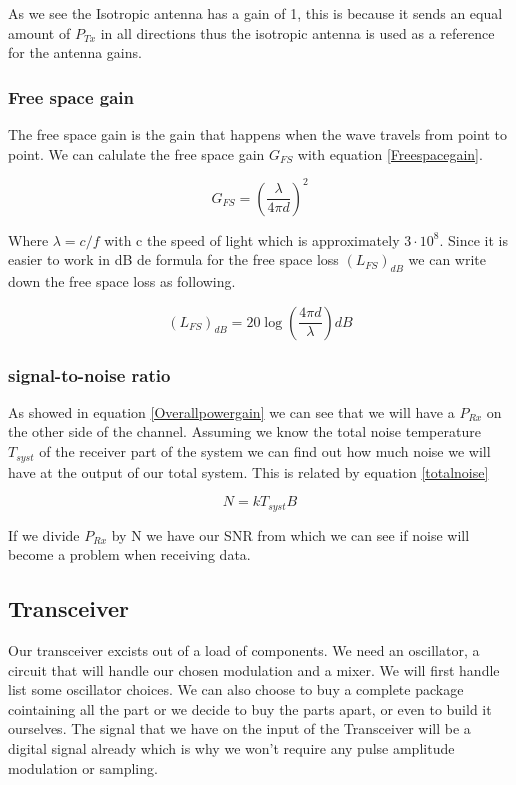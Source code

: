 \documentclass[10pt,a4paper]{article}
\begin{document}
As we see the Isotropic antenna has a gain of 1, this is because it sends an equal amount of $P_{Tx}$ in all directions thus the isotropic antenna is used as a reference for the antenna gains.

\subsubsection{Free space gain}
The free space gain is the gain that happens when the wave travels from point to point. We can calulate the free space gain $G_{FS}$ with equation \ref{Freespacegain}.

\begin{equation}
\label{Freespacegain}
G_{FS} = (\frac{\lambda}{4\pi d})^2
\end{equation}

Where $\lambda = c/f$ with c the speed of light which is approximately $3\cdot 10^8$. Since it is easier to work in dB de formula for the free space loss $(L_{FS})_{dB}$ we can write down the free space loss as following.

\begin{equation}
(L_{FS})_{dB} = 20 \log(\frac{4\pi d}{\lambda})dB
\end{equation}

\subsubsection{signal-to-noise ratio}
As showed in equation \ref{Overallpowergain} we can see that we will have a $P_{Rx}$ on the other side of the channel. Assuming we know the total noise temperature $T_{syst}$ of the receiver part of the system we can find out how much noise we will have at the output of our total system. This is related by equation \ref{totalnoise}

\begin{equation}
\label{totalnoise}
N=kT_{syst}B
\end{equation}

If we divide $P_{Rx}$ by N we have our SNR from which we can see if noise will become a problem when receiving data.

\subsection{Transceiver}
Our transceiver excists out of a load of components. We need an oscillator, a circuit that will handle our chosen modulation and a mixer. We will first handle list some oscillator choices. We can also choose to buy a complete package cointaining all the part or we decide to buy the parts apart, or even to build it ourselves. The signal that we have on the input of the Transceiver will be a digital signal already which is why we won't require any pulse amplitude modulation or sampling.
\end{document}
